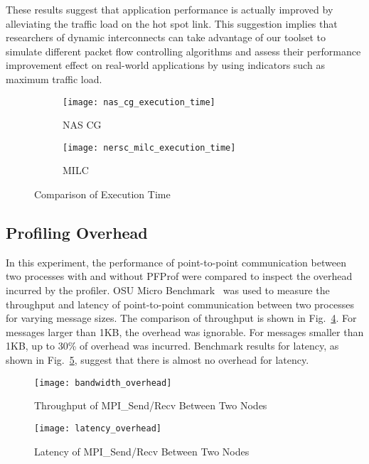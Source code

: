 These results suggest that application performance is actually improved
by alleviating the traffic load on the hot spot link. This suggestion
implies that researchers of dynamic interconnects can take advantage of
our toolset to simulate different packet flow controlling algorithms and
assess their performance improvement effect on real-world applications
by using indicators such as maximum traffic load.

\begin{figure}
    \begin{subfigure}{.47\linewidth}
        \centering
        \texttt{[image: nas\_cg\_execution\_time]}
        \caption{NAS CG}%
        \label{fig:nas-cg-time}
    \end{subfigure}%
    \begin{subfigure}{.47\linewidth}
        \centering
        \texttt{[image: nersc\_milc\_execution\_time]}
        \caption{MILC}%
        \label{fig:nersc-milc-time}
    \end{subfigure}
    \caption{Comparison of Execution Time}%
    \label{fig:single-job-time}
\end{figure}

\subsection{Profiling Overhead}

In this experiment, the performance of point-to-point communication
between two processes with and without PFProf were compared to inspect
the overhead incurred by the profiler. OSU Micro
Benchmark~\autocite{omb} was used to measure the throughput and latency
of point-to-point communication between two processes for varying
message sizes. The comparison of throughput is shown in
Fig.~\ref{fig:bandwidth-overhead}. For messages larger than 1KB, the
overhead was ignorable. For messages smaller than 1KB, up to 30\% of
overhead was incurred. Benchmark results for latency, as shown in
Fig.~\ref{fig:latency-overhead}, suggest that there is almost no
overhead for latency.

\begin{figure}
    \centering
    \texttt{[image: bandwidth\_overhead]}
    \caption{Throughput of MPI\_Send/Recv Between Two Nodes}%
    \label{fig:bandwidth-overhead}
\end{figure}

\begin{figure}
    \centering
    \texttt{[image: latency\_overhead]}
    \caption{Latency of MPI\_Send/Recv Between Two Nodes}%
    \label{fig:latency-overhead}
\end{figure}

